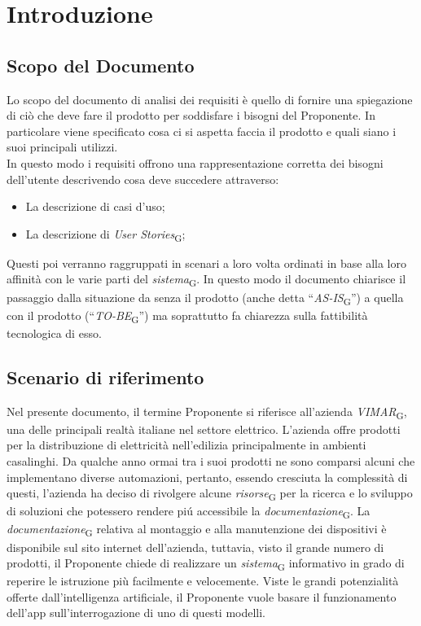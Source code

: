 \section{Introduzione}
\subsection{Scopo del Documento}
Lo scopo del documento di analisi dei requisiti è quello di fornire una spiegazione di ciò che deve fare il prodotto per soddisfare i bisogni del Proponente. In particolare viene specificato cosa ci si aspetta faccia il prodotto e quali siano i suoi principali utilizzi. \\
In questo modo i requisiti offrono una rappresentazione corretta dei bisogni dell’utente descrivendo cosa deve succedere attraverso:
\begin{itemize}
    \item La descrizione di casi d’uso;
    \item La descrizione di \textit{User Stories}\textsubscript{G};
\end{itemize}
Questi poi verranno raggruppati in scenari a loro volta ordinati in base alla loro affinità con le varie parti del \textit{sistema}\textsubscript{G}. In questo modo il documento chiarisce il passaggio dalla situazione da senza il prodotto (anche detta ``\textit{AS-IS}\textsubscript{G}”) a quella con il prodotto (“\textit{TO-BE}\textsubscript{G}”) ma soprattutto fa chiarezza sulla fattibilità tecnologica di esso.

\subsection{Scenario di riferimento} 
Nel presente documento, il termine Proponente si riferisce all'azienda \textit{VIMAR}\textsubscript{G}, una delle principali realtà italiane nel settore elettrico. L’azienda offre prodotti per la distribuzione di elettricità nell’edilizia principalmente in ambienti casalinghi. Da qualche anno ormai tra i suoi prodotti ne sono comparsi alcuni che implementano diverse automazioni, pertanto, essendo cresciuta la complessità di questi, l’azienda ha deciso di rivolgere alcune \textit{risorse}\textsubscript{G} per la ricerca e lo sviluppo di soluzioni che potessero rendere piú accessibile la \textit{documentazione}\textsubscript{G}. La \textit{documentazione}\textsubscript{G} relativa al montaggio e alla manutenzione dei dispositivi è disponibile sul sito internet dell’azienda, tuttavia, visto il grande numero di prodotti, il Proponente chiede di realizzare un \textit{sistema}\textsubscript{G} informativo in grado di reperire le istruzione più facilmente e velocemente. Viste le grandi potenzialità offerte dall’intelligenza artificiale, il Proponente vuole basare il funzionamento dell’app sull’interrogazione di uno di questi modelli.


